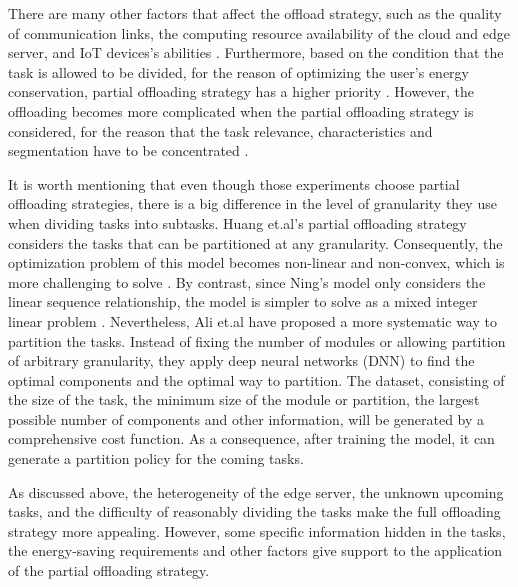 \documentclass[a4paper,11pt]{article}
\begin{document}
\newline\newline
There are many other factors that affect the offload strategy, such as the quality of communication links, the computing resource availability of the cloud and edge server, and IoT devices's abilities \cite{A_Cooperative_Partial_Computation_Offloading_Scheme_for_Mobile_Edge}. Furthermore, based on the condition that the task is allowed to be divided, for the reason of optimizing the user's energy conservation, partial offloading strategy has a higher priority \cite{save_energy}. However, the offloading becomes more complicated when the partial offloading strategy is considered, for the reason that the task relevance, characteristics and segmentation have to be concentrated \cite{user_central}. \newline

It is worth mentioning that even though those experiments choose partial offloading strategies, there is a big difference in the level of granularity they use when dividing tasks into subtasks. Huang et.al's partial offloading strategy considers the tasks that can be partitioned at any granularity. Consequently, the optimization problem of this model becomes non-linear and non-convex, which is more challenging to solve \cite{Distributed_Offloading_in_Overlapping_Areas}. By contrast, since Ning's model only considers the linear sequence relationship, the model is simpler to solve as a mixed integer linear problem \cite{A_Cooperative_Partial_Computation_Offloading_Scheme_for_Mobile_Edge}. Nevertheless, Ali et.al \cite{granuity_2} have proposed a more systematic way to partition the tasks. Instead of fixing the number of modules or allowing partition of arbitrary granularity, they apply deep neural networks (DNN) to find the optimal components and the optimal way to partition. The dataset, consisting of the size of the task, the minimum size of the module or partition, the largest possible number of components and other information, will be generated by a comprehensive cost function. As a consequence, after training the model, it can generate a partition policy for the coming tasks.\newline

As discussed above, the heterogeneity of the edge server, the unknown upcoming tasks, and the difficulty of reasonably dividing the tasks make the full offloading strategy more appealing. However, some specific information hidden in the tasks, the energy-saving requirements and other factors give support to the application of the partial offloading strategy. 
\end{document}
